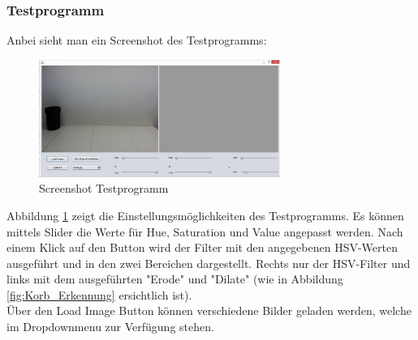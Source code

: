 \subsubsection{Testprogramm}
Anbei sieht man ein Screenshot des Testprogramms:
\begin{figure}[h!]
    \centering
    \includegraphics[width=0.7\textwidth]{fig/Testprogramm.png}
    \caption{Screenshot Testprogramm}
    \label{fig:Korb_Testprogramm}
\end{figure}

\noindent Abbildung \ref{fig:Korb_Testprogramm} zeigt die Einstellungsmöglichkeiten des 
Testprogramms. Es können mittels Slider die Werte für Hue, Saturation und 
Value angepasst werden. Nach einem Klick auf den Button wird der Filter mit 
den angegebenen HSV-Werten ausgeführt und in den zwei Bereichen dargestellt. 
Rechts nur der HSV-Filter und links mit dem ausgeführten "{}Erode"{} und "{}Dilate"{} (wie in Abbildung 
\ref{fig:Korb_Erkennung} ersichtlich ist). \\
Über den Load Image Button können verschiedene Bilder geladen werden, welche 
im Dropdownmenu zur Verfügung stehen.
